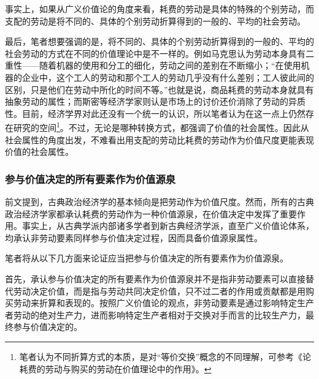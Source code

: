 事实上，如果从广义价值论的角度来看，耗费的劳动是具体的特殊的个别劳动，而支配的劳动是将不同的、具体的个别劳动折算得到的一般的、平均的社会劳动。

最后，笔者想要强调的是，将不同的、具体的个别劳动折算得到的一般的、平均的社会劳动的方式在不同的价值理论中是不一样的。例如马克思认为劳动本身具有二重性——随着机器的使用和分工的细化，劳动之间的差别在不断缩小\cite[96]{ZhongGongZhongYangMaKeSiEnGeSiLieNingSiDaLinZhuZuoBianYiJuMaKeSiEnGeSiQuanJiDi4Juan1958}；“在使用机器的企业中，这个工人的劳动和那个工人的劳动几乎没有什么差别；工人彼此间的区别，只是他们在劳动中所化的时间不等。”\cite[97]{ZhongGongZhongYangMaKeSiEnGeSiLieNingSiDaLinZhuZuoBianYiJuMaKeSiEnGeSiQuanJiDi4Juan1958}也就是说，商品耗费的劳动本身就具有抽象劳动的属性；而斯密等经济学家则认是市场上的讨价还价消除了劳动的异质性。目前，经济学界对此还没有一个统一的认识，所以笔者认为在这一点上仍然存在研究的空间\footnote{笔者认为不同折算方式的本质，是对“等价交换”概念的不同理解，可参考《论耗费的劳动与购买的劳动在价值理论中的作用》\cite[69]{CaiJiMingLunHaoFeiDeLaoDongYuGouMaiDeLaoDongZaiJieZhiLiLunZhongDeZuoYong2022}。}。不过，无论是哪种转换方式，都强调了价值的社会属性。因此从社会属性的角度出发，不难看出用支配的劳动比耗费的劳动作为价值尺度更能表现价值的社会属性。

\subsubsection{参与价值决定的所有要素作为价值源泉}

前文提到，古典政治经济学的基本倾向是把劳动作为价值尺度。然而，所有的古典政治经济学家都承认耗费的劳动作为一种价值源泉，在价值决定中发挥了重要作用。事实上，从古典学派内部诸多学者到新古典经济学派，直至广义价值论体系，均承认非劳动要素同样参与价值决定过程，因而具备价值源泉属性。

笔者将从以下几方面来论证应当把参与价值决定的所有要素作为价值源泉。

首先，承认参与价值决定的所有要素作为价值源泉并不是指非劳动要素可以直接替代劳动决定价值，而是指与劳动共同决定价值，只不过二者的作用或贡献都是用购买劳动来折算和表现的。按照广义价值论的观点，非劳动要素是通过影响特定生产者劳动的绝对生产力，进而影响特定生产者相对于交换对手而言的比较生产力，最终参与价值决定的。

